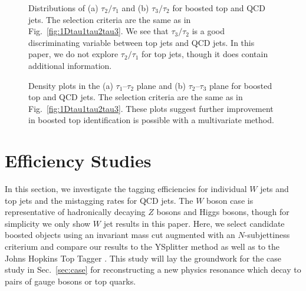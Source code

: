 \documentclass{JHEP3}
\newcommand{\vsh}{\vspace{-.5cm}}
\DeclareRobustCommand{\Sec}[1]{Sec.~\ref{#1}}
\DeclareRobustCommand{\Fig}[1]{Fig.~\ref{#1}}
\begin{document}
\begin{figure}[p]
  \begin{center}
  \end{center}
  \vsh
    \caption{Distributions of (a) $\tau_2/\tau_1$ and (b) $\tau_3/\tau_2$ for boosted top and QCD jets.  The selection criteria are the same as in \Fig{fig:1Dtau1tau2tau3}.  We see that $\tau_3/\tau_2$ is a good discriminating variable between top jets and QCD jets.  In this paper, we do not explore $\tau_2/\tau_1$ for top jets, though it does contain additional information.}  \label{fig:1Dtau123ratios}  
\end{figure}

\begin{figure}[p]
  \begin{center}
  \end{center}
  \vsh
  \caption{Density plots in the (a) $\tau_1$--$\tau_2$ plane and (b) $\tau_2$--$\tau_3$ plane for boosted top and QCD jets.  The selection criteria are the same as in \Fig{fig:1Dtau1tau2tau3}.  These plots suggest further improvement in boosted top identification is possible with a multivariate method.}
  \label{fig:Top2Dtau123}
\end{figure}

\clearpage

\section{Efficiency Studies}
\label{sec:efficiency}

In this section, we investigate the tagging efficiencies for individual $W$ jets and top jets and the mistagging rates for QCD jets.  The $W$ boson case is representative of hadronically decaying $Z$ bosons and Higgs bosons, though for simplicity we only show $W$ jet results in this paper.  Here, we select candidate boosted objects using an invariant mass cut augmented with an $N$-subjettiness criterium and compare our results to the YSplitter method \cite{Butterworth:2002tt,YSplitter,Brooijmans:2008} as well as to the Johns Hopkins Top Tagger \cite{Kaplan:2008ie}.  This study will lay the groundwork for the case study in \Sec{sec:case} for reconstructing a new physics resonance which decay to pairs of gauge bosons or top quarks.  
\end{document}
